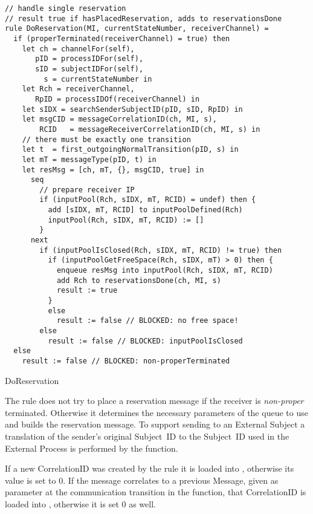\begin{listing}[H]
\begin{verbatim}
// handle single reservation
// result true if hasPlacedReservation, adds to reservationsDone
rule DoReservation(MI, currentStateNumber, receiverChannel) =
  if (properTerminated(receiverChannel) = true) then
    let ch = channelFor(self),
       pID = processIDFor(self),
       sID = subjectIDFor(self),
         s = currentStateNumber in
    let Rch = receiverChannel,
       RpID = processIDOf(receiverChannel) in
    let sIDX = searchSenderSubjectID(pID, sID, RpID) in
    let msgCID = messageCorrelationID(ch, MI, s),
        RCID   = messageReceiverCorrelationID(ch, MI, s) in
    // there must be exactly one transition
    let t  = first_outgoingNormalTransition(pID, s) in
    let mT = messageType(pID, t) in
    let resMsg = [ch, mT, {}, msgCID, true] in
      seq
        // prepare receiver IP
        if (inputPool(Rch, sIDX, mT, RCID) = undef) then {
          add [sIDX, mT, RCID] to inputPoolDefined(Rch)
          inputPool(Rch, sIDX, mT, RCID) := []
        }
      next
        if (inputPoolIsClosed(Rch, sIDX, mT, RCID) != true) then
          if (inputPoolGetFreeSpace(Rch, sIDX, mT) > 0) then {
            enqueue resMsg into inputPool(Rch, sIDX, mT, RCID)
            add Rch to reservationsDone(ch, MI, s)
            result := true
          }
          else
            result := false // BLOCKED: no free space!
        else
          result := false // BLOCKED: inputPoolIsClosed
  else
    result := false // BLOCKED: non-properTerminated
\end{verbatim}
\caption{DoReservation}
\label{lst:shortasm:DoReservation}
\end{listing}


The  rule does not try to place a reservation message
if the receiver is \textit{non-proper} terminated. Otherwise it determines
the necessary parameters of the queue to use and builds the reservation message.
To support sending to an External Subject a translation of the sender's original
Subject~ID to the Subject~ID used in the External Process is performed by the
 function.

If a new CorrelationID was created by the  rule it is
loaded into , otherwise its value is set to 0. If the
message correlates to a previous Message, given as parameter at the communication transition
in the  function, that CorrelationID is
loaded into , otherwise it is set 0 as well.

